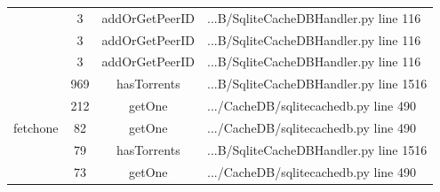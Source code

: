 \begin{table}[]
{\begin{tabular}{|c|c|c|l|}
			\multicolumn{1}{|c|}{} & \multicolumn{1}{c|}{3}  & \multicolumn{1}{c|}{addOrGetPeerID}  & \multicolumn{1}{l|}{...B/SqliteCacheDBHandler.py line 116}  \\ \cline{2-4} 
			\multicolumn{1}{|c|}{} & \multicolumn{1}{c|}{3}  & \multicolumn{1}{c|}{addOrGetPeerID}  & \multicolumn{1}{l|}{...B/SqliteCacheDBHandler.py line 116}  \\ \cline{2-4} 
			\multicolumn{1}{|c|}{} & \multicolumn{1}{c|}{3}  & \multicolumn{1}{c|}{addOrGetPeerID}  & \multicolumn{1}{l|}{...B/SqliteCacheDBHandler.py line 116}  \\ \hline 
			\multicolumn{1}{|c|}{\multirow{5}{*}{fetchone}} & \multicolumn{1}{c|}{969} & \multicolumn{1}{c|}{hasTorrents} & \multicolumn{1}{l|}{...B/SqliteCacheDBHandler.py line 1516} \\ \cline{2-4}
			\multicolumn{1}{|c|}{} & \multicolumn{1}{c|}{212}  & \multicolumn{1}{c|}{getOne}  & \multicolumn{1}{l|}{.../CacheDB/sqlitecachedb.py line 490}  \\ \cline{2-4} 
			\multicolumn{1}{|c|}{} & \multicolumn{1}{c|}{82}  & \multicolumn{1}{c|}{getOne}  & \multicolumn{1}{l|}{.../CacheDB/sqlitecachedb.py line 490}  \\ \cline{2-4} 
			\multicolumn{1}{|c|}{} & \multicolumn{1}{c|}{79}  & \multicolumn{1}{c|}{hasTorrents}  & \multicolumn{1}{l|}{...B/SqliteCacheDBHandler.py line 1516}  \\ \cline{2-4} 
			\multicolumn{1}{|c|}{} & \multicolumn{1}{c|}{73}  & \multicolumn{1}{c|}{getOne}  & \multicolumn{1}{l|}{.../CacheDB/sqlitecachedb.py line 490}  \\ \hline 
		\end{tabular}}
	\end{table}
		